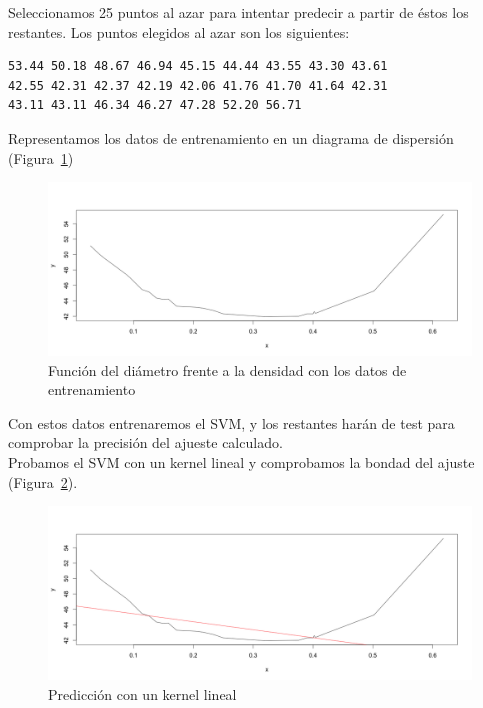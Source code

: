 \documentclass[12pt,a4paper,twoside,openright,titlepage,final]{article}
\begin{document}
Seleccionamos 25 puntos al azar para intentar predecir a partir de éstos los restantes. Los puntos elegidos al azar son los siguientes:

\begin{verbatim}
53.44 50.18 48.67 46.94 45.15 44.44 43.55 43.30 43.61 
42.55 42.31 42.37 42.19 42.06 41.76 41.70 41.64 42.31 
43.11 43.11 46.34 46.27 47.28 52.20 56.71
\end{verbatim}

Representamos los datos de entrenamiento en un diagrama de dispersión (Figura~\ref{fig:plot_datos_entrenamiento})\\

\begin{figure}
\centering
\includegraphics[width=0.8\linewidth]{imagenes/plot_datos_entrenamiento}
\caption{Función del diámetro frente a la densidad con los datos de entrenamiento}
\label{fig:plot_datos_entrenamiento}
\end{figure}

Con estos datos entrenaremos el SVM, y los restantes harán de test para comprobar la precisión del ajueste calculado.\\

Probamos el SVM con un kernel lineal y comprobamos la bondad del ajuste (Figura~\ref{fig:plot_kernel_lineal}).\\

\begin{figure}
\centering
\includegraphics[width=0.8\linewidth]{imagenes/plot_kernel_lineal}
\caption{Predicción con un kernel lineal}
\label{fig:plot_kernel_lineal}
\end{figure}
\end{document}
